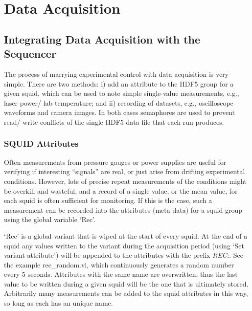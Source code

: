 \documentclass[10pt,a4paper]{article}
\begin{document}
\section{Data Acquisition}
\subsection{Integrating Data Acquisition with the Sequencer}
The process of marrying experimental control with data acquisition is very simple.  There are two methods: i) add an attribute to the HDF5 group for a given squid, which can be used to note simple single-value measurements, e.g., laser power/ lab temperature; and ii) recording of datasets, e.g., oscilloscope waveforms and camera images.  In both cases semaphores are used to prevent read/ write conflicts of the single HDF5 data file that each run produces.

\subsubsection{SQUID Attributes}
Often measurements from pressure gauges or power supplies are useful for verifying if interesting ``signals'' are real, or just arise from drifting experimental conditions.  However, lots of precise repeat measurements of the conditions might be overkill and wasteful, and a record of a single value, or the mean value, for each squid is often sufficient for monitoring.  If this is the case, such a measurement can be recorded into the attributes (meta-data) for a squid group using the global variable `Rec'.

`Rec' is a global variant that is wiped at the start of every squid.  At the end of a squid any values written to the variant during the acquisition period (using `Set variant attribute') will be appended to the attributes with the prefix \emph{REC:}.  See the example rec\_random.vi, which continuously generates a random number every 5 seconds.  Attributes with the same name are overwritten, thus the last value to be written during a given squid will be the one that is ultimately stored. Arbitrarily  many measurements can be added to the squid attributes in this way, so long as each has an unique name.
\end{document}
